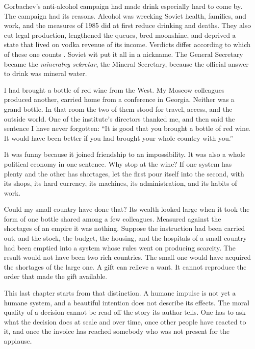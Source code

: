 \documentclass[12pt,a4paper]{book}
\begin{document}
Gorbachev's anti-alcohol campaign had made drink especially hard to come by. The campaign had its reasons. Alcohol was wrecking Soviet health, families, and work, and the measures of 1985 did at first reduce drinking and deaths. They also cut legal production, lengthened the queues, bred moonshine, and deprived a state that lived on vodka revenue of its income. Verdicts differ according to which of these one counts \cite{BhattacharyaGathmannMiller2013,Reitan2001}. Soviet wit put it all in a nickname. The General Secretary became the \emph{mineralny sekretar}, the Mineral Secretary, because the official answer to drink was mineral water.

I had brought a bottle of red wine from the West. My Moscow colleagues produced another, carried home from a conference in Georgia. Neither was a grand bottle. In that room the two of them stood for travel, access, and the outside world. One of the institute's directors thanked me, and then said the sentence I have never forgotten: ``It is good that you brought a bottle of red wine. It would have been better if you had brought your whole country with you.''

It was funny because it joined friendship to an impossibility. It was also a whole political economy in one sentence. Why stop at the wine? If one system has plenty and the other has shortages, let the first pour itself into the second, with its shops, its hard currency, its machines, its administration, and its habits of work.

Could my small country have done that? Its wealth looked large when it took the form of one bottle shared among a few colleagues. Measured against the shortages of an empire it was nothing. Suppose the instruction had been carried out, and the stock, the budget, the housing, and the hospitals of a small country had been emptied into a system whose rules went on producing scarcity. The result would not have been two rich countries. The small one would have acquired the shortages of the large one. A gift can relieve a want. It cannot reproduce the order that made the gift available.

This last chapter starts from that distinction. A humane impulse is not yet a humane system, and a beautiful intention does not describe its effects. The moral quality of a decision cannot be read off the story its author tells. One has to ask what the decision does at scale and over time, once other people have reacted to it, and once the invoice has reached somebody who was not present for the applause.
\end{document}
